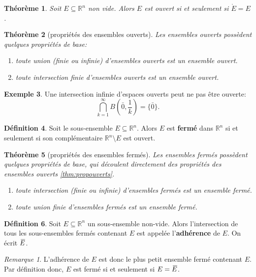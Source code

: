 \documentclass{report}
\theoremstyle{plain}
\newtheorem{thm}{Théorème}[chapter]
\theoremstyle{definition}
\newtheorem{defn}[thm]{Définition}
\newtheorem{exmp}[thm]{Exemple}
\theoremstyle{remark}
\newtheorem*{remark}{Remarque}
\newcommand*{\skol}[2][3]{{}\mkern#1mu\overline{\mkern-#1mu#2}} %
\newcommand*\adh[1]{\skol{#1}}
\newcommand*{\interior}[1]{\mathring{#1}}
\begin{document}
\begin{thm}
	Soit $E \subseteq \mathbb R^n$ non vide. Alors $E$ est ouvert si et seulement si $\interior E = E$.
\end{thm}

\label{thm:propouverts}\begin{thm}[propriétés des ensembles ouverts] Les ensembles ouverts possèdent quelques propriétés de base:
	\begin{enumerate}
		\item toute union (finie ou infinie) d'ensembles ouverts est un ensemble ouvert.
		\item toute intersection finie d'ensembles ouverts est un ensemble ouvert.
	\end{enumerate}
\end{thm}

\begin{exmp}
	Une intersection infinie d'espaces ouverts peut ne pas être ouverte:
	\begin{equation*}
		\bigcap_{k = 1}^\infty B(\bar 0, \frac1k) = \{\bar 0\}.
	\end{equation*}
\end{exmp}

\begin{defn}
	Soit le sous-ensemble $E \subseteq \mathbb R^n$. Alors $E$ est \textbf{fermé} dans $\mathbb R^n$ si et seulement si son complémentaire $\mathbb R^n \setminus E$ est ouvert.
\end{defn}

\begin{thm}[propriétés des ensembles fermés] Les ensembles fermés possèdent quelques propriétés de base, qui découlent directement des propriétés des ensembles ouverts \eqref{thm:propouverts}.
	\begin{enumerate}
		\item toute intersection (finie ou infinie) d'ensembles fermés est un ensemble fermé.
		\item toute union finie d'ensembles fermés est un ensemble fermé.
	\end{enumerate}
\end{thm}

\begin{defn}
	Soit $E \subseteq \mathbb R^n$ un sous-ensemble non-vide. Alors l'intersection de tous les sous-ensembles fermés contenant $E$ est appelée l'\textbf{adhérence} de $E$. On écrit $\adh E$.
\end{defn}
\begin{remark} L'adhérence de $E$ est donc le plus petit ensemble fermé contenant $E$. Par définition donc, $E$ est fermé si et seulement si $E = \adh E$.\end{remark}
\end{document}
